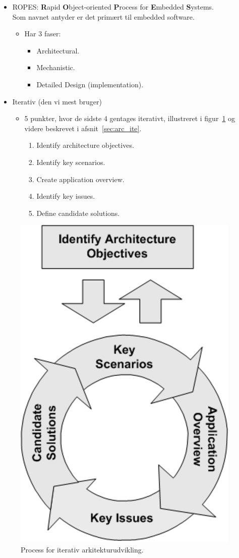 \begin{itemize}
	\item ROPES: \textbf{R}apid \textbf{O}bject-oriented \textbf{P}rocess for \textbf{E}mbedded \textbf{S}ystems.\\
	Som navnet antyder er det primært til embedded software.
	\begin{itemize}
		\item Har 3 faser:
		\begin{itemize}
			\item Architectural.
			\item Mechanistic.
			\item Detailed Design (implementation).
		\end{itemize}
	\end{itemize}
	\item Iterativ (den vi mest bruger)
	\begin{itemize}
		\item 5 punkter, hvor de sidste 4 gentages iterativt, illustreret i figur~\ref{fig:arc_ite} og videre beskrevet i afsnit~\ref{sec:arc_ite}.
		\begin{enumerate}
			\item Identify architecture objectives.
			\item Identify key scenarios.
			\item Create application overview.
			\item Identify key issues.
			\item Define candidate solutions.
		\end{enumerate}
	\end{itemize}
\end{itemize}

\begin{figure}[h]
	\centering
	\includegraphics[width=0.35\linewidth]{figs/arc_ite}
	\caption{Process for iterativ arkitekturudvikling.}
	\label{fig:arc_ite}
\end{figure}

